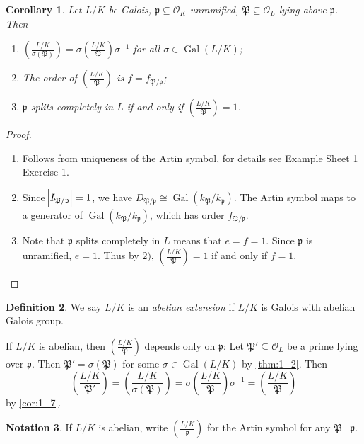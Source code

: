 \documentclass[11pt]{article}
\theoremstyle{definition}
\newtheorem{definition}{Definition}[section]
\newtheorem{notation}[definition]{Notation}
\theoremstyle{plain}
\newtheorem{corollary}[definition]{Corollary}
\theoremstyle{remark}
\DeclareMathOperator{\Gal}{Gal}
\newcommand{\cO}{\mathcal{O}}
\newcommand{\cp}{\mathfrak{P}}
\newcommand{\fp}{\mathfrak{p}}
\newcommand{\leg}[2]{\left(\frac{#1}{#2}\right)}
\begin{document}
\begin{corollary}\label{cor:1_7}
    Let $L/K$ be Galois, $\fp \subseteq \cO_K$ unramified, $\cp \subseteq \cO_L$ lying above $\fp$. Then
    \begin{enumerate}
        \item $\leg{L/K}{\sigma(\cp)} = \sigma \leg{L/K}{\cp} \sigma^{-1}$ for all $\sigma \in \Gal(L/K)$;

        \item The order of $\leg{L/K}{\cp}$ is $f = f_{\cp / \fp}$;

        \item $\fp$ splits completely in $L$ if and only if $\leg{L/K}{\cp} = 1$.
    \end{enumerate}
\end{corollary}
\begin{proof}\phantom{}
    \begin{enumerate}
        \item Follows from uniqueness of the Artin symbol, for details see Example Sheet 1 Exercise 1.

        \item Since $\abs{I_{\cp / \fp}} = 1$, we have $D_{\cp / \fp} \cong \Gal(k_\cp / k_\fp)$. The Artin symbol maps to a generator of $\Gal(k_\cp / k_\fp)$, which has order $f_{\cp / \fp}$.

        \item Note that $\fp$ splits completely in $L$ means that $e = f = 1$. Since $\fp$ is unramified, $e = 1$. Thus by $2)$, $\leg{L/K}{\cp} = 1$ if and only if $f = 1$. \qedhere
    \end{enumerate}
\end{proof}

\begin{definition}\label{def:1_8}
    We say $L/K$ is an \emph{abelian extension} if $L/K$ is Galois with abelian Galois group.
\end{definition}

If $L/K$ is abelian, then $\leg{L/K}{\cp}$ depends only on $\fp$: Let $\cp' \subseteq \cO_L$ be a prime lying over $\fp$. Then $\cp' = \sigma(\cp)$ for some $\sigma \in \Gal(L/K)$ by \autoref{thm:1_2}. Then
\begin{equation*}
    \leg{L/K}{\cp'} = \leg{L/K}{\sigma(\cp)} = \sigma \leg{L/K}{\cp} \sigma^{-1} = \leg{L/K}{\cp}
\end{equation*}
by \autoref{cor:1_7}.

\begin{notation}\label{not:1_9}
    If $L/K$ is abelian, write $\leg{L/K}{\fp}$ for the Artin symbol for any $\cp \mid \fp$.
\end{notation}
\end{document}

